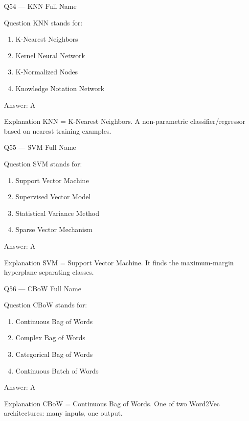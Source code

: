 \documentclass[aspectratio=169,8pt]{beamer}
\begin{document}
	\begin{frame}{Q54 --- KNN Full Name}
		\begin{block}{Question}
			KNN stands for:
			\begin{enumerate}
				\item K-Nearest Neighbors
				\item Kernel Neural Network
				\item K-Normalized Nodes
				\item Knowledge Notation Network
			\end{enumerate}
		\end{block}
		\begin{exampleblock}{Answer: A}\end{exampleblock}
		\begin{block}{Explanation}
			KNN = K-Nearest Neighbors. A non-parametric classifier/regressor based on nearest training examples.
		\end{block}
	\end{frame}
	
	\begin{frame}{Q55 --- SVM Full Name}
		\begin{block}{Question}
			SVM stands for:
			\begin{enumerate}
				\item Support Vector Machine
				\item Supervised Vector Model
				\item Statistical Variance Method
				\item Sparse Vector Mechanism
			\end{enumerate}
		\end{block}
		\begin{exampleblock}{Answer: A}\end{exampleblock}
		\begin{block}{Explanation}
			SVM = Support Vector Machine. It finds the maximum-margin hyperplane separating classes.
		\end{block}
	\end{frame}
	
	\begin{frame}{Q56 --- CBoW Full Name}
		\begin{block}{Question}
			CBoW stands for:
			\begin{enumerate}
				\item Continuous Bag of Words
				\item Complex Bag of Words
				\item Categorical Bag of Words
				\item Continuous Batch of Words
			\end{enumerate}
		\end{block}
		\begin{exampleblock}{Answer: A}\end{exampleblock}
		\begin{block}{Explanation}
			CBoW = Continuous Bag of Words. One of two Word2Vec architectures: many inputs, one output.
		\end{block}
	\end{frame}
	
\end{document}
